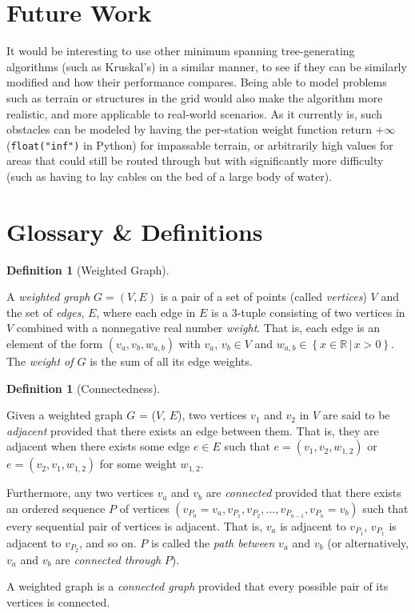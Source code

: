 \documentclass[12pt,letterpaper]{article}
\theoremstyle{definition}\newtheorem{defn}[defncounter]{Definition}
\theoremstyle{remark}\newtheorem*{remark}{Remark}
\begin{document}
\section{Future Work} It would be interesting to use other minimum spanning tree-generating algorithms (such as Kruskal's) in a 
similar manner, to see if they can be similarly modified and how their performance compares. Being able to model problems such as 
terrain or structures in the grid would also make the algorithm more realistic, and more applicable to real-world scenarios. As it 
currently is, such obstacles can be modeled by having the per-station weight function return \(+\infty\) (\texttt{float("inf")} in 
Python) for impassable terrain, or arbitrarily high values for areas that could still be routed through but with significantly 
more difficulty (such as having to lay cables on the bed of a large body of water).


\section{Glossary \& Definitions}

\begin{defn}[Weighted Graph]\label{graph_defn}

A \emph{weighted graph} \(G = (V, E)\) is a pair of a set of 
points (called \emph{vertices}) \(V\) and the set of \emph{edges}, \(E\), where each edge in \(E\) is a 3-tuple consisting of two 
vertices in \(V\) combined with a nonnegative real number \emph{weight}. That is, each edge is an element of the form \((v_a, v_b, 
w_{a,b})\) with \(v_a\), \(v_b \in V\) and \(w_{a,b} \in \left\{x \in \mathbb{R} \,\vert\, x > 0\right\}\). The \emph{weight of 
\(G\)} is the sum of all its edge weights.


\end{defn}

\begin{defn}[Connectedness]\label{connectedness_defn}

Given a weighted graph \(G\) = (\(V\), \(E\)), two vertices \(v_1\) and \(v_2\) in \(V\) are said to be \emph{adjacent} provided 
that there exists an edge between them. That is, they are adjacent when there exists some edge \(e \in E\) such that \(e = 
(v_1, v_2, w_{1,2})\) or \(e = (v_2, v_1, w_{1,2})\) for some weight \(w_{1,2}\).

Furthermore, any two vertices \(v_a\) and \(v_b\) are \emph{connected} provided that there exists an ordered sequence \(P\) of 
vertices \((v_{P_0} = v_a , v_{P_1}, v_{P_2}, \ldots, v_{P_{n-1}}, v_{P_n} = v_b)\) such that every sequential pair of vertices is 
adjacent. That is, \(v_a\) is adjacent to \(v_{P_1}\), \(v_{P_1}\) is adjacent to \(v_{P_2}\), and so on. \(P\) is called the 
\emph{path between} \(v_a\) and \(v_b\) (or alternatively, \(v_a\) and \(v_b\) are \emph{connected through} \(P\)).

A weighted graph is a \emph{connected graph} provided that every possible pair of its vertices is
connected.

\end{defn}
\end{document}

